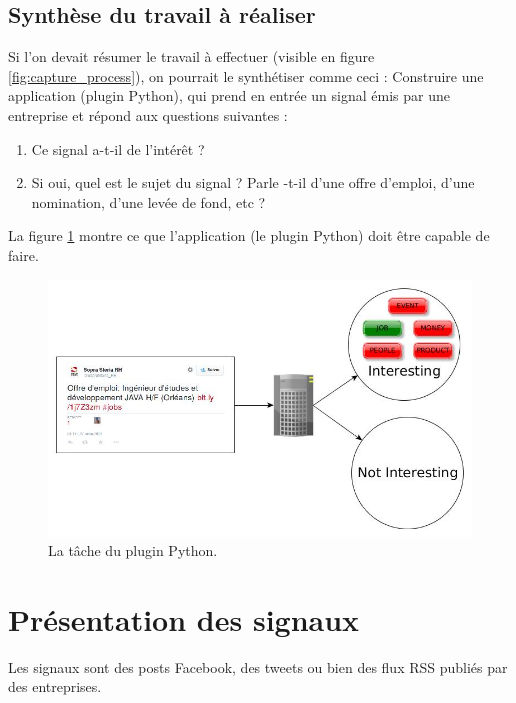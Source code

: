     \subsection{Synthèse du travail à réaliser}
        Si l'on devait résumer le travail à effectuer (visible en figure \ref{fig:capture_process}), on pourrait le synthétiser comme ceci : Construire une application (plugin Python), qui prend en entrée un signal émis par une entreprise et répond aux questions suivantes :
        \begin{enumerate}
            \item Ce signal a-t-il de l'intérêt ?
            \item Si oui, quel est le sujet du signal ? Parle -t-il d'une offre d'emploi, d'une nomination, d'une levée de fond, etc ?
        \end{enumerate}
        La figure \ref{fig:process} montre ce que l'application (le plugin Python) doit être capable de faire.

        \begin{figure}[h!]
            \centering
            \includegraphics[width=\textwidth]{images/process.jpg}
            \caption{La tâche du plugin Python.}
            \label{fig:process}
        \end{figure}

\section{Présentation des signaux}
    Les signaux sont des posts Facebook, des tweets ou bien des flux RSS publiés par des entreprises.

